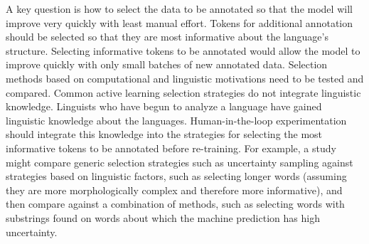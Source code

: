A key question is how to select the data to be annotated so that the model will improve very quickly with least manual effort. Tokens for additional annotation should be selected so that they are most informative about the language's structure. Selecting informative tokens to be annotated would allow the model to improve quickly with only small batches of new annotated data. Selection methods based on computational and linguistic motivations need to be tested and compared. 
Common active learning selection strategies do not integrate linguistic knowledge. %
Linguists who have begun to analyze a language have gained linguistic knowledge about the languages. Human-in-the-loop experimentation should integrate this knowledge into the strategies for selecting the most informative tokens to be annotated before re-training. For example, a study might compare generic selection strategies such as uncertainty sampling against strategies based on linguistic factors, such as selecting longer words (assuming they are more morphologically complex and therefore more informative), and then compare against a combination of methods, such as selecting words with substrings found on words about which the machine prediction has high uncertainty.

